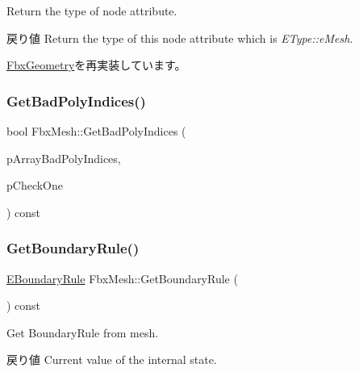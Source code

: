 Return the type of node attribute. \begin{DoxyReturn}{戻り値}
Return the type of this node attribute which is {\itshape E\+Type\+::e\+Mesh}. 
\end{DoxyReturn}


\hyperlink{class_fbx_geometry_a41ae23e5d0cf08693bca49737f333de9}{Fbx\+Geometry}を再実装しています。

\mbox{\label{class_fbx_mesh_ae2148a3e615dac499fbbbe57a714547e}} 
\subsubsection{\texorpdfstring{Get\+Bad\+Poly\+Indices()}{GetBadPolyIndices()}}
{\footnotesize\ttfamily bool Fbx\+Mesh\+::\+Get\+Bad\+Poly\+Indices (\begin{DoxyParamCaption}\item[{\hyperlink{class_fbx_array}{Fbx\+Array}$<$ int $>$ \&}]{p\+Array\+Bad\+Poly\+Indices,  }\item[{bool}]{p\+Check\+One }\end{DoxyParamCaption}) const\hspace{0.3cm}{\ttfamily [protected]}}

\mbox{\label{class_fbx_mesh_a14ac6bb49f273e5a57301a22c0957025}} 
\subsubsection{\texorpdfstring{Get\+Boundary\+Rule()}{GetBoundaryRule()}}
{\footnotesize\ttfamily \hyperlink{class_fbx_mesh_ab9e7d41ffcd49467a374c72e0d6f3561}{E\+Boundary\+Rule} Fbx\+Mesh\+::\+Get\+Boundary\+Rule (\begin{DoxyParamCaption}{ }\end{DoxyParamCaption}) const}

Get Boundary\+Rule from mesh. \begin{DoxyReturn}{戻り値}
Current value of the internal state. 
\end{DoxyReturn}
\mbox{\label{class_fbx_mesh_ad1eee689b760a6147a2ee8090453ea9b}} 
